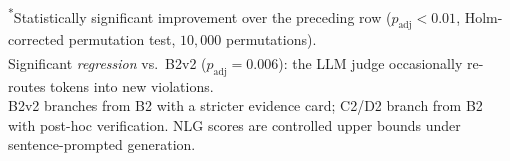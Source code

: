 \begin{table}[t]
\vspace{4pt}
{\footnotesize\raggedright
\textsuperscript{*}Statistically significant improvement over the preceding row ($p_{\mathrm{adj}}{<}0.01$, Holm-corrected permutation test, $10{,}000$ permutations).\\
\textsuperscript{\dag}Significant \emph{regression} vs.\ B2\textquotesingle v2 ($p_{\mathrm{adj}}{=}0.006$): the LLM judge occasionally re-routes tokens into new violations.\\
B2\textquotesingle v2 branches from B2\textquotesingle{} with a stricter evidence card; C2\textquotesingle/D2 branch from B2\textquotesingle{} with post-hoc verification.
NLG scores are controlled upper bounds under sentence-prompted generation.\par
}
\end{table}
